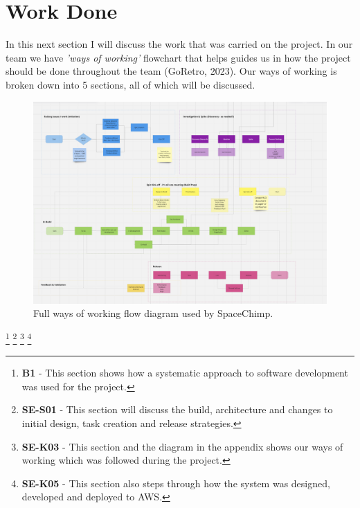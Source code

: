 \section{Work Done}
  In this next section I will discuss the work that was carried on the project. In our team we have \textit{'ways of working'}
  flowchart that helps guides us in how the project should be done throughout the team (GoRetro, 2023). Our ways of working is broken down into 5 sections, 
  all of which will be discussed.

  \begin{figure}[H]
    \centering
    \includegraphics[width=12cm]{assets/workflow/fullWorkflow.png}
    \caption{Full ways of working flow diagram used by SpaceChimp.}
    \label{fig:fullWorkflow}
  \end{figure}

  \footnote{\textbf{B1} - This section shows how a systematic approach to software development was used for the project.}
  \footnote{\textbf{SE-S01} - This section will discuss the build, architecture and changes to initial design, task creation and release strategies.}
  \footnote{\textbf{SE-K03} - This section and the diagram in the appendix shows our ways of working which was followed during the project.}
  \footnote{\textbf{SE-K05} - This section also steps through how the system was designed, developed and deployed to AWS.}

  \newpage

  
  
  
  
  

  \newpage
  
  